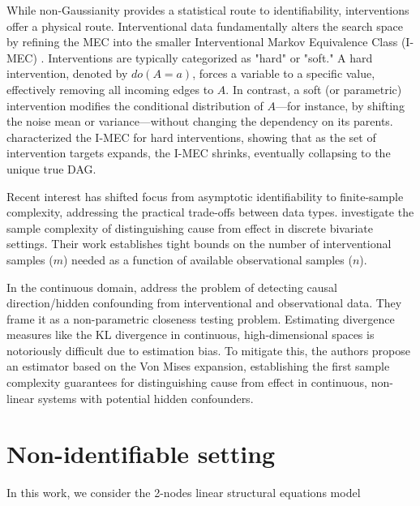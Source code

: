 \documentclass[accepted]{uai2026} %
\theoremstyle{boldremark}
\begin{document}
While non-Gaussianity provides a statistical route to identifiability, interventions offer a physical route. Interventional data fundamentally alters the search space by refining the MEC into the smaller Interventional Markov Equivalence Class (I-MEC) \citet{hauser2012characterizationgreedylearninginterventional}. Interventions are typically categorized as "hard" or "soft." A hard intervention, denoted by $do(A=a)$, forces a variable to a specific value, effectively removing all incoming edges to $A$. In contrast, a soft (or parametric) intervention modifies the conditional distribution of $A$—for instance, by shifting the noise mean or variance—without changing the dependency on its parents. \citet{hauser2012characterizationgreedylearninginterventional} characterized the I-MEC for hard interventions, showing that as the set of intervention targets expands, the I-MEC shrinks, eventually collapsing to the unique true DAG.

Recent interest has shifted focus from asymptotic identifiability to finite-sample complexity, addressing the practical trade-offs between data types. \citet{acharya23b} investigate the sample complexity of distinguishing cause from effect in discrete bivariate settings.  Their work establishes tight bounds on the number of interventional samples ($m$) needed as a function of available observational samples ($n$).

In the continuous domain, \citet{jamshidi2025samplecomplexitynonparametriccloseness} address the problem of 
detecting causal direction/hidden confounding from interventional and observational data. They frame it as a non-parametric closeness testing problem. Estimating divergence measures like the KL divergence in continuous, high-dimensional spaces is notoriously difficult due to estimation bias. To mitigate this, the authors propose an estimator based on the Von Mises expansion, establishing the first sample complexity guarantees for distinguishing cause from effect in continuous, non-linear systems with potential hidden confounders. %


\section{Non-identifiable setting}
\label{sec:non_ident}

In this work, we consider the 2-nodes linear structural equations model
\end{document}
